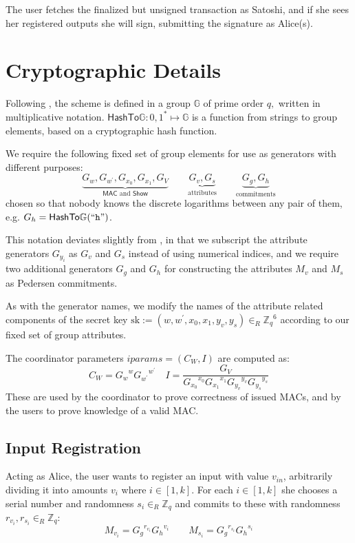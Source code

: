 \documentclass{article}
\begin{document}
The user fetches the finalized but unsigned transaction as Satoshi, and if she sees her registered outputs she will sign, submitting the signature as Alice(s).

\section{Cryptographic Details}

Following \cite{chase2019signal}, the scheme is defined in a group \(\mathbb{G}\) of prime order \(q,\) written in multiplicative notation. 
$\mathsf{HashTo\mathbb{G}} : {0,1}^* \mapsto \mathbb{G}$ is a function from strings to group elements, based on a cryptographic hash function.

We require the following fixed set of group elements for use as generators with different purposes:
\[
\underbrace{G_{w}, G_{w^{\prime}}, G_{x_{0}}, G_{x_{1}}, G_{V}}_{\mathsf{MAC} \text{~and~} \mathsf{Show}}
\qquad
\underbrace{G_{v}, G_{s}}_{\text{attributes}}
\qquad
\underbrace{G_g, G_h}_{\text{commitments}}
\]
chosen so that nobody knows the discrete logarithms between any pair of them, e.g. $G_h = \mathsf{HashTo\mathbb{G}}(``\texttt{h}")$.

This notation deviates slightly from \cite{chase2019signal}, in that we subscript the attribute generators $G_{y_i}$ as $G_v$ and $G_s$ instead of using numerical indices, and we require two additional generators $G_g$ and $G_h$ for constructing the attributes $M_v$ and $M_s$ as Pedersen commitments.

As with the generator names, we modify the names of the attribute related components of the secret key
$\mathrm{sk} := (w, w^{\prime}, x_{0}, x_{1}, y_{v}, y_{s}) \in_R {\mathbb{Z}_q}^6$
according to our fixed set of group attributes.

The coordinator parameters
$\mathit{iparams} =  (C_{W}, I)$
are computed as:
\[
C_{W}={G_w}^{w} {G_{w^\prime}}^{w^\prime}
\quad
I=\frac{G_{V}}{{G_{x_0}}^{x_0} {G_{x_1}}^{x_1} {G_{y_v}}^{y_v} {G_{y_s}}^{y_s}}
\]
These are used by the coordinator to prove correctness of issued MACs, and by the users to prove knowledge of a valid MAC.

\subsection{Input Registration}

Acting as Alice, the user wants to register an input with value $v_{\mathit{in}}$, arbitrarily dividing it into amounts $v_i$ where $i \in \left[1,k\right]$. For each $i \in [1, k]$ she chooses a serial number and randomness $s_i \in_R \mathbb{Z}_q$ and commits to these with randomness $r_{v_i}, r_{s_i} \in_R \mathbb{Z}_q$:
\[ M_{v_i}={G_g}^{r_{v_i}}{G_h}^{v_i} \qquad M_{s_i}={G_g}^{r_{s_i}}{G_h}^{s_i} \]
\end{document}
